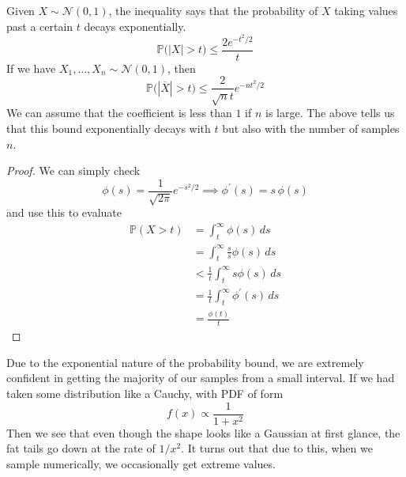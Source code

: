 \documentclass{article}
\begin{document}
    \begin{theorem}
      Given $X \sim \mathcal{N}(0, 1)$, the inequality says that the probability of $X$ taking values past a certain $t$ decays exponentially. 
      \begin{equation}
        \mathbb{P} \big( |X| > t \big) \leq \frac{2 e^{-t^2/2}}{t}
      \end{equation}
      If we have $X_1, \ldots, X_n \sim \mathcal{N}(0, 1)$, then 
      \begin{equation}
        \mathbb{P} \big( |\overline{X}| > t \big) \leq \frac{2}{\sqrt{n} t} e^{-n t^2/2}
      \end{equation}
      We can assume that the coefficient is less than $1$ if $n$ is large. The above tells us that this bound exponentially decays with $t$ but also with the number of samples $n$. 
    \end{theorem}
    \begin{proof}
      We can simply check 
      \begin{equation}
        \phi(s) = \frac{1}{\sqrt{2\pi}} e^{-s^2/2} \implies \phi^\prime (s) = s \, \phi(s)
      \end{equation}
      and use this to evaluate
      \begin{align*}
        \mathbb{P}(X > t ) & = \int_t^\infty \phi(s) \,ds \\
        & = \int_t^\infty \frac{s}{s} \phi(s) \,ds \\
        & < \frac{1}{t} \int_t^\infty s \phi(s)\,ds \\
        & = \frac{1}{t} \int_t^\infty \phi^\prime (s)\,ds \\
        & = \frac{\phi(t)}{t}
      \end{align*}
    \end{proof}

    Due to the exponential nature of the probability bound, we are extremely confident in getting the majority of our samples from a small interval. If we had taken some distribution like a Cauchy, with PDF of form 
    \begin{equation}
      f(x) \propto \frac{1}{1 + x^2}
    \end{equation}
    Then we see that even though the shape looks like a Gaussian at first glance, the fat tails go down at the rate of $1/x^2$. It turns out that due to this, when we sample numerically, we occasionally get extreme values. 
\end{document}
